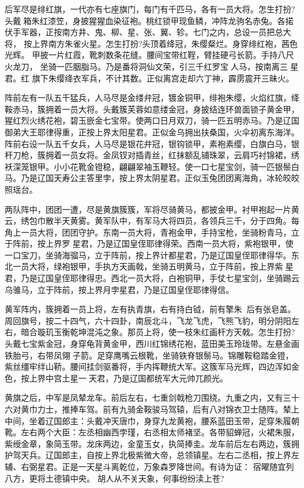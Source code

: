 后军尽是绯红旗，一代亦有七座旗门，每门有千匹马，各有一员大将。怎生打扮?
头戴箱朱红漆笠，身披猩猩血染征袍。桃红锁甲现鱼鳞，冲阵龙驹名赤兔。各掿
伏手军器，正按南方井、鬼、柳、星、张、翼、轸。七门之内，总设一员把总大将，
按上界南方朱雀火星。怎生打扮?头顶着绛冠，朱缨粲烂。身穿绯红袍，茜色光辉。
甲披一片红霞，靴刺数条花缝。腰间宝带红鞓，臂挂硬弓长箭。手持八尺火龙刀，
坐骑一匹胭脂马。乃是番将洞仙文荣，引三千红罗宝人马，按南离三星君。红
旗下朱缨绛衣军兵，不计其数。正似离宫走却六丁神，霹雳震开三昧火。

阵前左有一队五千猛兵，人马尽是金缕弁冠，镀金铜甲，绯袍朱缨，火焰红旗，绛
鞍赤马，簇拥着一员大将。头戴簇芙蓉如意缕金冠，身披结连环兽面锁子黄金甲，
猩红烈火绣花袍，碧玉嵌金七宝带。使两口日月双刀，骑一匹五明赤马。乃是辽国
御弟大王耶律得重，正按上界太阳星君。正似金乌拥出扶桑国，火伞初离东海洋。
阵前右设一队五千女兵，人马尽是银花弁冠，银钩锁甲，素袍素缨，白旗白马，银
杆刀枪，簇拥着一员女将。金凤钗对插青丝，红抹额乱铺珠翠，云肩巧衬锦裙，绣
袄深笼银甲。小小花靴金镫稳，翩翩翠袖玉鞭轻。使一口七星宝剑，骑一匹银鬃白
马。乃是辽国天寿公主答里孛，按上界太阴星君。正似玉兔团团离海角，冰轮皎皎
照瑶台。

两队阵中，团团一遭，尽是黄旗簇簇，军将尽骑黄马，都披金甲。衬甲袍起一片黄
云，绣包巾散半天黄雾。黄军队中，有军马大将四员，各领兵三千，分于四角。每
角上一员大将，团团守护。东南一员大将，青袍金甲，手持宝枪，坐骑粉青马，立
于阵前，按上界罗星君，乃是辽国皇侄耶律得荣。西南一员大将，紫袍银甲，使
一口宝刀，坐骑海骝马，立于阵前，按上界计都星君，乃是辽国皇侄耶律得华。东
北一员大将，绿袍银甲，手执方天画戟，坐骑五明黄马，立于阵前，按上界紫星
君，乃是辽国皇侄耶律得忠。西北一员大将，白袍铜甲，手仗七星宝剑，坐骑踢云
乌骓马，立于阵前，按上界月孛星君，乃是辽国皇侄耶律得信。

黄军阵内，簇拥着一员上将，左有执青旗，右有持白钺，前有擎朱，后有张皂盖。
周回旗号，按二十四气，六十四卦，南辰北斗，飞龙飞虎，飞熊飞豹，明分阴阳左
右，暗合璇玑玉衡乾坤混沌之象。那员上将，使一枝朱红画杆方天戟。怎生打扮?
头戴七宝紫金冠，身穿龟背黄金甲，西川红锦绣花袍，蓝田美玉玲珑带。左悬金画
铁胎弓，右带凤翎子箭。足穿鹰嘴云根靴，坐骑铁脊银鬃马。锦雕鞍稳踏金镫，
紫丝缰牢绊山鞒。腰间挂剑驱番将，手内挥鞭统大军。这簇军马光辉，四边浑如金
色，按上界中宫土星一天君，乃是辽国都统军大元帅兀颜光。

黄旗之后，中军是凤辇龙车。前后左右，七重剑戟枪刀围绕。九重之内，又有三十
六对黄巾力士，推捧车驾。前有九骑金鞍骏马驾辕，后有八对锦衣卫士随阵。辇上
中间，坐着辽国郎主：头戴冲天唐巾，身穿九龙黄袍，腰系蓝田玉带，足穿朱履朝
靴。左右两个大臣：左丞相幽西孛瑾，右丞相太师褚坚。各带貂蝉冠，火裙朱服，
紫绶金章，象简玉带。龙床两边，金童玉女，执简捧圭。龙车前后左右两边，簇拥
护驾天兵。辽国郎主，自按上界北极紫微大帝，总领镇星。左右二丞相，按上界左
辅、右弼星君。正是一天星斗离乾位，万象森罗降世间。有诗为证：
宿曜随宜列八方，更将土德镇中央。
胡人从不关天象，何事纷纷渎上苍?

